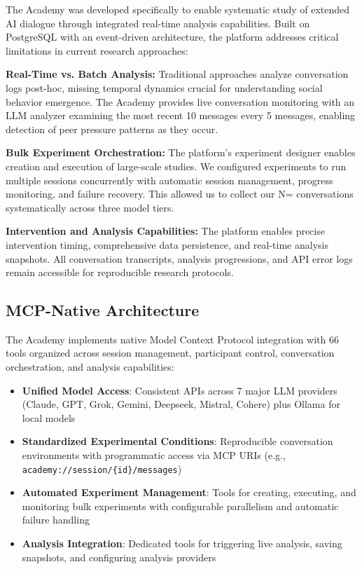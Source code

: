 \documentclass[11pt,letterpaper]{article}
\newcommand{\theacademy}{The Academy}
\newcommand{\exponedataTotalSessionsRaw}{37}
\newcommand{\exptwoTotalSessionsRaw}{31}
\newcommand{\expthreeTotalSessionsRaw}{30}
\newcommand{\totalAllPhasesRaw}{\fpeval{\exponedataTotalSessionsRaw + \exptwoTotalSessionsRaw + \expthreeTotalSessionsRaw}}
\newcommand{\totalAllPhases}{N=\totalAllPhasesRaw}
\begin{document}
\theacademy{} was developed specifically to enable systematic study of extended AI dialogue through integrated real-time analysis capabilities. Built on PostgreSQL with an event-driven architecture, the platform addresses critical limitations in current research approaches:

\textbf{Real-Time vs. Batch Analysis:} Traditional approaches analyze conversation logs post-hoc, missing temporal dynamics crucial for understanding social behavior emergence. \theacademy{} provides live conversation monitoring with an LLM analyzer examining the most recent 10 messages every 5 messages, enabling detection of peer pressure patterns as they occur.

\textbf{Bulk Experiment Orchestration:} The platform's experiment designer enables creation and execution of large-scale studies. We configured experiments to run multiple sessions concurrently with automatic session management, progress monitoring, and failure recovery. This allowed us to collect our \totalAllPhases{} conversations systematically across three model tiers.

\textbf{Intervention and Analysis Capabilities:} The platform enables precise intervention timing, comprehensive data persistence, and real-time analysis snapshots. All conversation transcripts, analysis progressions, and API error logs remain accessible for reproducible research protocols.

\subsection{MCP-Native Architecture}

\theacademy{} implements native Model Context Protocol integration with 66 tools organized across session management, participant control, conversation orchestration, and analysis capabilities:

\begin{itemize}
    \item \textbf{Unified Model Access}: Consistent APIs across 7 major LLM providers (Claude, GPT, Grok, Gemini, Deepseek, Mistral, Cohere) plus Ollama for local models
    \item \textbf{Standardized Experimental Conditions}: Reproducible conversation environments with programmatic access via MCP URIs (e.g., \texttt{academy://session/\{id\}/messages})
    \item \textbf{Automated Experiment Management}: Tools for creating, executing, and monitoring bulk experiments with configurable parallelism and automatic failure handling
    \item \textbf{Analysis Integration}: Dedicated tools for triggering live analysis, saving snapshots, and configuring analysis providers
\end{itemize}
\end{document}

